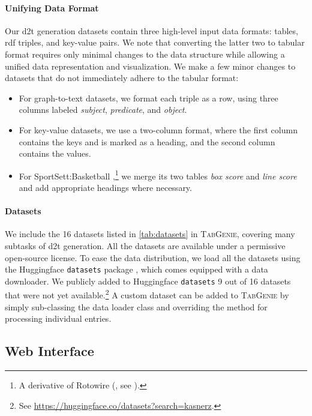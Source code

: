 \paragraph{Unifying Data Format} Our \ac{d2t} generation datasets contain three high-level input data formats: tables, \acs{rdf} triples, and key-value pairs. We note that converting the latter two to tabular format requires only minimal changes to the data structure while allowing a unified data representation and visualization. We make a few minor changes to datasets that do not immediately adhere to the tabular format:

\begin{itemize}
    \item For graph-to-text datasets, we format each triple as a row, using three columns labeled \textit{subject}, \textit{predicate}, and \textit{object}.
    \item For key-value datasets, we use a two-column format, where the first column contains the keys and is marked as a heading, and the second column contains the values.
    \item For SportSett:Basketball \cite{thomson2020sportsett},\footnote{A derivative of Rotowire (\citealp{wiseman2017challenges}, see ).} we merge its two tables \textit{box score} and \textit{line score} and add appropriate headings where necessary.
\end{itemize}


\paragraph{Datasets}
We include the 16 datasets listed in \autoref{tab:datasets} in \textsc{TabGenie}, covering many subtasks of \ac{d2t} generation. All the datasets are available under a permissive open-source license. To ease the data distribution, we load all the datasets using the Huggingface \texttt{datasets} package \cite{lhoest2021datasets}, which comes equipped with a data downloader. We publicly added to Huggingface \texttt{datasets} 9 out of 16 datasets that were not yet available.\footnote{See \url{https://huggingface.co/datasets?search=kasnerz}.} A custom dataset can be added to \textsc{TabGenie} by simply sub-classing the data loader class and overriding the method for processing individual entries.

\subsection{Web Interface}
\label{sec:tabgenie:web}

